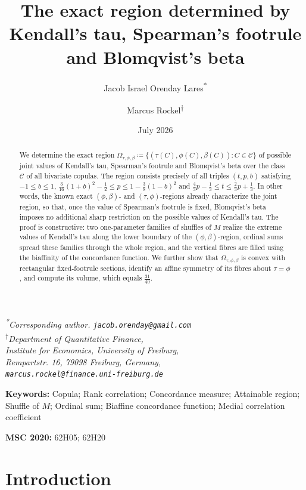 \documentclass{article}
\title{
	The exact region determined by Kendall's tau, Spearman's footrule and Blomqvist's beta
}
\author{%
  Jacob Israel Orenday Lares\textsuperscript{*}
  \and
  Marcus Rockel\textsuperscript{$\dagger$}
}
\date{July 2026}
\newcommand{\keywords}[1]{\par\medskip\noindent\textbf{Keywords:} #1}
\begin{document}
\maketitle
\begin{center}
  \small\textit{\textsuperscript{*}Corresponding author. \texttt{jacob.orenday@gmail.com}}\\[2mm]
  \small\textit{%
    \textsuperscript{$\dagger$}Department of Quantitative Finance,\\
    Institute for Economics, University of Freiburg,\\
    Rempartstr. 16, 79098 Freiburg, Germany,\\
    \texttt{marcus.rockel@finance.uni-freiburg.de}
  }
\end{center}

\begin{abstract}
We determine the exact region $\Omega_{\tau,\phi,\beta}\coloneqq \{(\tau(C),\phi(C),\beta(C)):C\in\mathcal{C}\}$ of possible joint values of Kendall's tau, Spearman's footrule and Blomqvist's beta over the class $\mathcal{C}$ of all bivariate copulas.
The region consists precisely of all triples $(t,p,b)$ satisfying $-1\le b\le 1$, $\frac{3}{16}(1+b)^2-\frac12\le p\le 1-\frac38(1-b)^2$ and $\frac43 p-\frac13\le t\le \frac23 p+\frac13$.
In other words, the known exact $(\phi,\beta)$- and $(\tau,\phi)$-regions already characterize the joint region, so that, once the value of Spearman's footrule is fixed, Blomqvist's beta imposes no additional sharp restriction on the possible values of Kendall's tau.
The proof is constructive: two one-parameter families of shuffles of $M$ realize the extreme values of Kendall's tau along the lower boundary of the $(\phi,\beta)$-region, ordinal sums spread these families through the whole region, and the vertical fibres are filled using the biaffinity of the concordance function.
We further show that $\Omega_{\tau,\phi,\beta}$ is convex with rectangular fixed-footrule sections, identify an affine symmetry of its fibres about $\tau=\phi$, and compute its volume, which equals $\frac{31}{40}$.
\end{abstract}

\keywords{Copula; Rank correlation; Concordance measure; Attainable region; Shuffle of $M$; Ordinal sum; Biaffine concordance function; Medial correlation coefficient}
\par\smallskip\noindent\textbf{MSC 2020:} 62H05; 62H20

\section{Introduction}\label{sec:intro}
\end{document}
